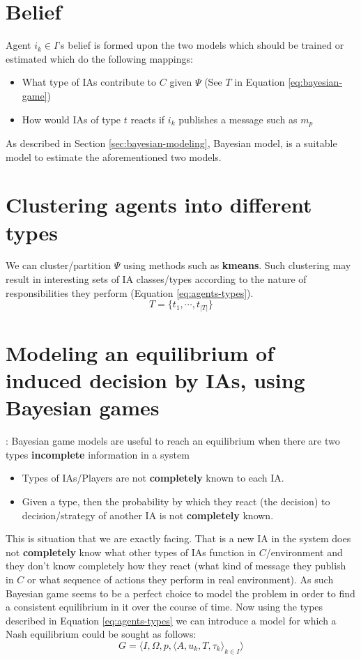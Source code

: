 \documentclass{article}
\begin{document}
\begin{multicols}{2}
	\section{Belief}\label{sec:belief}
		Agent $i_k\in I$'s belief is formed upon the two models which should be trained or estimated which do the following mappings:
		\begin{itemize}
			\item What type of IAs contribute to $C$ given $\Psi$ (See $T$ in Equation \ref{eq:bayesian-game})
			\item How would IAs of type $t$ reacts if $i_k$ publishes a message such as $m_p$ 
		\end{itemize}
		As described in Section \ref{sec:bayesian-modeling}, Bayesian model, is a suitable model to estimate the aforementioned two models. 
		
		
	\section{Clustering agents into different types}\label{sec:clustering-agents-into-types}
		We can cluster/partition $\Psi$ using methods such as \textbf{kmeans}. Such clustering may result in interesting sets of IA classes/types according to the nature of responsibilities they perform (Equation \ref{eq:agents-types}).
		\begin{equation}
			T = \{t_1,\dotsb,t_{|T|}\}
			\label{eq:agents-types}
		\end{equation}	
				
	\section{Modeling an equilibrium of induced decision by IAs, using Bayesian games}: \label{sec:bayesian-modeling}	    
		Bayesian game models are useful to reach an equilibrium when there are two types \textbf{incomplete} information in a system 
		\begin{itemize}
			\item Types of IAs/Players are not \textbf{completely} known to each IA.
			\item Given a type, then the probability by which they react (the decision) to decision/strategy of another IA is not \textbf{completely} known. 
		\end{itemize}
		This is situation that we are exactly facing. That is a new IA in the system does not \textbf{completely} know what other types of IAs function in $C$/environment and they don't know completely how they react (what kind of message they publish in $C$ or what sequence of actions they perform in real environment). As such Bayesian game seems to be a perfect choice to model the problem in order to find a consistent equilibrium in it over the course of time. 
		Now using the types described in Equation \ref{eq:agents-types} we can introduce a model for which a Nash equilibrium could be sought as follows:
		\begin{equation}
			G=\langle I, \Omega ,p,\langle A,u_{k},T,\tau_k\rangle_{k\in I}\rangle
			\label{eq:bayesian-game}
		\end{equation}
		

\end{multicols}
\end{document}
